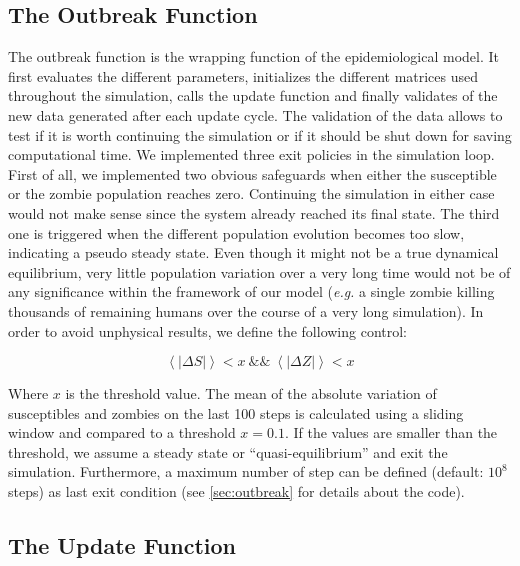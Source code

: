\documentclass[11pt]{article} %
\begin{document}
\subsection{The Outbreak Function}\indent
\label{outbreakimpl}

The outbreak function is the wrapping function of the epidemiological model. It first evaluates the different parameters, initializes the different matrices used throughout the simulation, calls the update function and finally validates of the new data generated after each update cycle. The validation of the data allows to test if it is worth continuing the simulation or if it should be shut down for saving computational time. We implemented three exit policies in the simulation loop. First of all, we implemented two obvious safeguards when either the susceptible or the zombie population reaches zero. Continuing the simulation in either case would not make sense since the system already reached its final state. The third one is triggered when the different population evolution becomes too slow, indicating a pseudo steady state. Even though it might not be a true dynamical equilibrium, very little population variation over a very long time would not be of any significance within the framework of our model (\textit{e.g.} a single zombie killing thousands of remaining humans over the course of a very long simulation). In order to avoid unphysical results, we define the following control:

\bigskip
\begin{equation} \label{eq:outbreakequilibrium}
\left\langle \left| \Delta S \right| \right\rangle < x\ \&\&\ \left\langle\left|\Delta Z \right| \right\rangle < x
\end{equation}
\bigskip

Where $x$ is the threshold value. The mean of the absolute variation of susceptibles and zombies on the last 100 steps is calculated using a sliding window and compared to a threshold $x = 0.1$. If the values are smaller than the threshold, we assume a steady state or ``quasi-equilibrium'' and exit the simulation. Furthermore, a maximum number of step can be defined (default: $10^8$ steps) as last exit condition (see \ref{sec:outbreak} for details about the code).

\subsection{The Update Function}\indent
\end{document}
